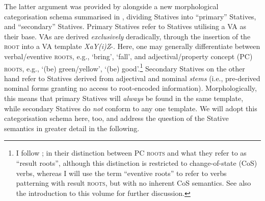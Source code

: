 \documentclass[output=paper,colorlinks,citecolor=brown]{langscibook}
\begin{document}
The latter argument was provided by \citet{kamil2023stative} alongside a new morphological categorisation schema summarised in , dividing Statives into “primary” Statives,  and “secondary” Statives. Primary Statives  refer to Statives utilising a VA as their base. VAs are derived \textit{exclusively} deradically, through the insertion of the \textsc{root} into a VA template \textit{XaY(i)Z}-. Here, one may generally differentiate between verbal/eventive \textsc{roots}, e.g.,  `bring',  `fall', and adjectival/property concept (PC) \textsc{roots}, e.g.,  `(be) green/yellow',  `(be) good'.\footnote{I follow \citet{BeaversKoontz2020}; \citet{Beaversetal2021} in their distinction between PC \textsc{roots} and what they refer to as “result roots”, although this distinction is restricted to change-of-state (CoS)  verbs, whereas I will use the term “eventive roots” to refer to verbs patterning with result \textsc{roots}, but with no inherent CoS  semantics. See also the introduction to this volume for further discussion.} Secondary Statives on the other hand refer to Statives derived from adjectival and nominal \textit{stems} (i.e., pre-derived nominal forms granting no access to root-encoded information). Morphologically, this means that primary Statives  will \textit{always} be found in the same template, while secondary Statives do \textit{not} conform to any one template. We will adopt this categorisation schema here, too, and address the question of the Stative semantics in greater detail in the following.
\end{document}

